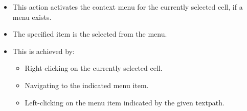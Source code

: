  
\begin{itemize}
\item This action activates the context menu for the currently selected cell, if a menu exists.
\item The specified item is the selected from the menu.
\item This is achieved by:
  \begin{itemize}
    \item Right-clicking on the currently selected cell.
    \item Navigating to the indicated menu item.
    \item Left-clicking on the menu item indicated by the given textpath.
  \end{itemize}

\end{itemize} 
